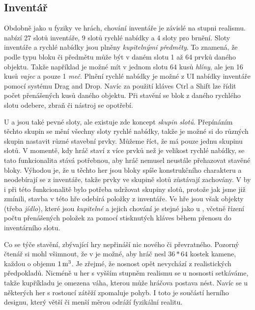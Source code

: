 \subsection{Inventář}
\label{subsec:inventory}

Obdobně jako u fyziky ve hrách, chování inventáře je závislé na stupni realismu. \MC{} nabízí 27 slotů inventáře, 9 slotů rychlé nabídky a 4 sloty pro brnění. Sloty inventáře a rychlé nabídky jsou plněny \textit{kupitelnými předměty}. To znamená, že podle typu bloku či předmětu může být v daném slotu 1 až 64 prvků daného objektu. Takže například je možné mít v jednom slotu 64 kusů \textit{hlíny}, ale jen 16 kusů \textit{vajec} a pouze 1 \textit{meč}. Plnění rychlé nabídky je možné z UI nabídky inventáře pomocí systému Drag and Drop. Navíc za použití kláves Ctrl a Shift lze řídit počet přenášených kusů daného objektu. Při stavění se blok z daného rychlého slotu odebere, zbraň či nástroj se opotřebí.

U \ME{} a \SE{} jsou také pevné sloty, ale existuje zde koncept \textit{skupin slotů}. Přepínáním těchto skupin se mění všechny sloty rychlé nabídky, takže je možné si do různých skupin nastavit různé stavební prvky. Můžeme říct, že \MC{} má pouze jednu skupinu slotů. V momentě, kdy hráč staví z více prvků než je velikost rychlé nabídky, se tato funkcionalita stává potřebnou, aby hráč nemusel neustále přehazovat stavěné bloky. Výhodou je, že u těchto her jsou bloky spíše konstrukčního charakteru a neodebírají se z inventáře, takže prvky ve skupině slotů zůstávají zachovány. V  by i při této funkcionalitě bylo potřeba udržovat skupiny slotů, protože jak jsme již zmínili, stavba v této hře odebírá položky z inventáře. Ve hře jsou však objekty (třeba \textit{jídlo}), které jsou \textit{kupitelné} a jejich chování je stejné jako u , včetně řízení počtu přenášených položek za pomocí stisknutých kláves během přenosu do inventárního slotu.

Co se týče stavění, zbývající hry nepřináší nic nového či převratného. Pozorný čtenář si mohl všimnout, že v  je možné, aby hráč nesl $36*64$ kostek kamene, každou o objemu $1\,\rm m^3$. Je zřejmé, že nosnost opět nevychází z realistických předpokladů. Nicméně u her s vyšším stupněm realismu se u nosnosti setkáváme, takže kupříkladu je omezena váha, kterou může hráčova postava nést. Navíc se u některých her s rostoucí zátěží zpomaluje pohyb. I toto je součástí herního designu, který větší či menší měrou odráží fyzikální realitu.

